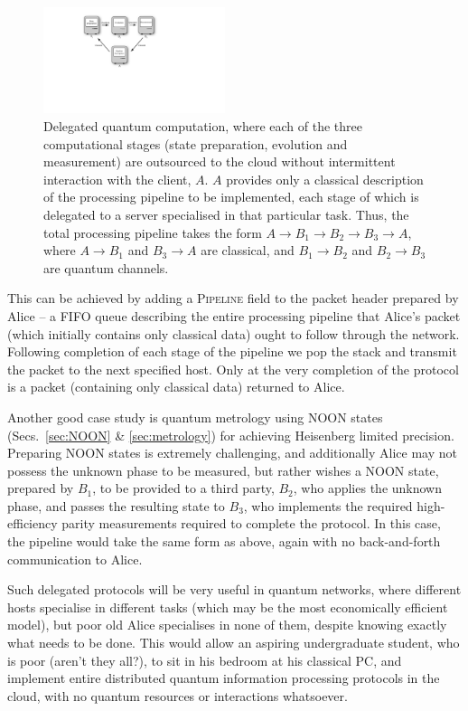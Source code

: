\begin{figure}[!htbp]
\includegraphics[clip=true, width=0.475\textwidth]{delegated}
\captionspacefig \caption{Delegated quantum computation, where each of the three computational stages (state preparation, evolution and measurement) are outsourced to the cloud without intermittent interaction with the client, $A$. $A$ provides only a classical description of the processing pipeline to be implemented, each stage of which is delegated to a server specialised in that particular task. Thus, the total processing pipeline takes the form \mbox{$A\to B_1\to B_2\to B_3\to A$}, where \mbox{$A\to B_1$} and \mbox{$B_3\to A$} are classical, and \mbox{$B_1\to B_2$} and \mbox{$B_2\to B_3$} are quantum channels.} \label{fig:delegated}
\end{figure}

This can be achieved by adding a \textsc{Pipeline} field to the packet header prepared by Alice -- a FIFO queue describing the entire processing pipeline that Alice's packet (which initially contains only classical data) ought to follow through the network. Following completion of each stage of the pipeline we pop the stack and transmit the packet to the next specified host. Only at the very completion of the protocol is a packet (containing only classical data) returned to Alice.

Another good case study is quantum metrology using NOON states (Secs.~\ref{sec:NOON} \& \ref{sec:metrology}) for achieving Heisenberg limited precision. Preparing NOON states is extremely challenging, and additionally Alice may not possess the unknown phase to be measured, but rather wishes a NOON state, prepared by $B_1$, to be provided to a third party, $B_2$, who applies the unknown phase, and passes the resulting state to $B_3$, who implements the required high-efficiency parity measurements required to complete the protocol. In this case, the pipeline would take the same form as above, again with no back-and-forth communication to Alice.

Such delegated protocols will be very useful in quantum networks, where different hosts specialise in different tasks (which may be the most economically efficient model), but poor old Alice specialises in none of them, despite knowing exactly what needs to be done. This would allow an aspiring undergraduate student, who is poor (aren't they all?), to sit in his bedroom at his classical PC, and implement entire distributed quantum information processing protocols in the cloud, with no quantum resources or interactions whatsoever.

